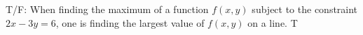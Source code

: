 {T/F: When finding the maximum of a function $f(x,y)$ subject to the constraint $2x - 3y = 6$, one is finding the largest value of $f(x,y)$ on a line.
}
{T}